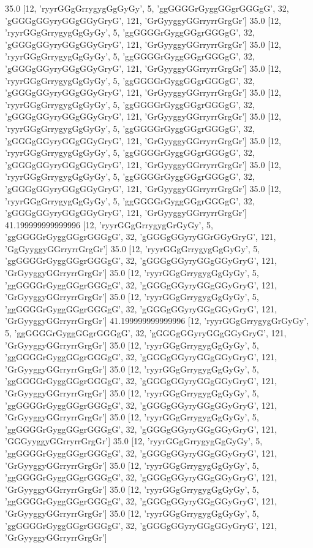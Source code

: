 35.0 [12, 'ryyrGGgGrrygygGgGyGy', 5, 'ggGGGGrGyggGGgrGGGgG', 32, 'gGGGgGGyryGGgGGyGryG', 121, 'GrGyyggyGGrryrrGrgGr']
35.0 [12, 'ryyrGGgGrrygygGgGyGy', 5, 'ggGGGGrGyggGGgrGGGgG', 32, 'gGGGgGGyryGGgGGyGryG', 121, 'GrGyyggyGGrryrrGrgGr']
35.0 [12, 'ryyrGGgGrrygygGgGyGy', 5, 'ggGGGGrGyggGGgrGGGgG', 32, 'gGGGgGGyryGGgGGyGryG', 121, 'GrGyyggyGGrryrrGrgGr']
35.0 [12, 'ryyrGGgGrrygygGgGyGy', 5, 'ggGGGGrGyggGGgrGGGgG', 32, 'gGGGgGGyryGGgGGyGryG', 121, 'GrGyyggyGGrryrrGrgGr']
35.0 [12, 'ryyrGGgGrrygygGgGyGy', 5, 'ggGGGGrGyggGGgrGGGgG', 32, 'gGGGgGGyryGGgGGyGryG', 121, 'GrGyyggyGGrryrrGrgGr']
35.0 [12, 'ryyrGGgGrrygygGgGyGy', 5, 'ggGGGGrGyggGGgrGGGgG', 32, 'gGGGgGGyryGGgGGyGryG', 121, 'GrGyyggyGGrryrrGrgGr']
35.0 [12, 'ryyrGGgGrrygygGgGyGy', 5, 'ggGGGGrGyggGGgrGGGgG', 32, 'gGGGgGGyryGGgGGyGryG', 121, 'GrGyyggyGGrryrrGrgGr']
35.0 [12, 'ryyrGGgGrrygygGgGyGy', 5, 'ggGGGGrGyggGGgrGGGgG', 32, 'gGGGgGGyryGGgGGyGryG', 121, 'GrGyyggyGGrryrrGrgGr']
35.0 [12, 'ryyrGGgGrrygygGgGyGy', 5, 'ggGGGGrGyggGGgrGGGgG', 32, 'gGGGgGGyryGGgGGyGryG', 121, 'GrGyyggyGGrryrrGrgGr']
41.199999999999996 [12, 'ryyrGGgGrrygygGrGyGy', 5, 'ggGGGGrGyggGGgrGGGgG', 32, 'gGGGgGGyryGGrGGyGryG', 121, 'GgGyyggyGGrryrrGrgGr']
35.0 [12, 'ryyrGGgGrrygygGgGyGy', 5, 'ggGGGGrGyggGGgrGGGgG', 32, 'gGGGgGGyryGGgGGyGryG', 121, 'GrGyyggyGGrryrrGrgGr']
35.0 [12, 'ryyrGGgGrrygygGgGyGy', 5, 'ggGGGGrGyggGGgrGGGgG', 32, 'gGGGgGGyryGGgGGyGryG', 121, 'GrGyyggyGGrryrrGrgGr']
35.0 [12, 'ryyrGGgGrrygygGgGyGy', 5, 'ggGGGGrGyggGGgrGGGgG', 32, 'gGGGgGGyryGGgGGyGryG', 121, 'GrGyyggyGGrryrrGrgGr']
41.199999999999996 [12, 'ryyrGGgGrrygygGrGyGy', 5, 'ggGGGGrGyggGGgrGGGgG', 32, 'gGGGgGGyryGGgGGyGryG', 121, 'GrGyyggyGGrryrrGrgGr']
35.0 [12, 'ryyrGGgGrrygygGgGyGy', 5, 'ggGGGGrGyggGGgrGGGgG', 32, 'gGGGgGGyryGGgGGyGryG', 121, 'GrGyyggyGGrryrrGrgGr']
35.0 [12, 'ryyrGGgGrrygygGgGyGy', 5, 'ggGGGGrGyggGGgrGGGgG', 32, 'gGGGgGGyryGGgGGyGryG', 121, 'GrGyyggyGGrryrrGrgGr']
35.0 [12, 'ryyrGGgGrrygygGgGyGy', 5, 'ggGGGGrGyggGGgrGGGgG', 32, 'gGGGgGGyryGGgGGyGryG', 121, 'GrGyyggyGGrryrrGrgGr']
35.0 [12, 'ryyrGGgGrrygygGgGyGy', 5, 'ggGGGGrGyggGGgrGGGgG', 32, 'gGGGgGGyryGGgGGyGryG', 121, 'GGGyyggyGGrryrrGrgGr']
35.0 [12, 'ryyrGGgGrrygygGgGyGy', 5, 'ggGGGGrGyggGGgrGGGgG', 32, 'gGGGgGGyryGGgGGyGryG', 121, 'GrGyyggyGGrryrrGrgGr']
35.0 [12, 'ryyrGGgGrrygygGgGyGy', 5, 'ggGGGGrGyggGGgrGGGgG', 32, 'gGGGgGGyryGGgGGyGryG', 121, 'GrGyyggyGGrryrrGrgGr']
35.0 [12, 'ryyrGGgGrrygygGgGyGy', 5, 'ggGGGGrGyggGGgrGGGgG', 32, 'gGGGgGGyryGGgGGyGryG', 121, 'GrGyyggyGGrryrrGrgGr']
35.0 [12, 'ryyrGGgGrrygygGgGyGy', 5, 'ggGGGGrGyggGGgrGGGgG', 32, 'gGGGgGGyryGGgGGyGryG', 121, 'GrGyyggyGGrryrrGrgGr']
